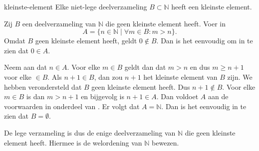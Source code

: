 \begin{stelling}{}{kleinste-element}
    Elke niet-lege deelverzameling $B \subset \mathbb{N}$ heeft een kleinste element.
\end{stelling}
\begin{bewijs}{}{}
    Zij $B$ een deelverzameling van $\mathbb{N}$ die geen kleinste element heeft.
    Voer in
    \[
        A = \{n \in \mathbb{N} \mid \forall m \in B: m > n\}.
    \]
    Omdat $B$ geen kleinste element heeft, geldt $0 \notin B$.
    Dan is het eenvoudig om in te zien dat $0 \in A$.

    Neem aan dat $n \in A$.
    Voor elke $m \in B$ geldt dan dat $m > n$ en dus $m \geq n+ 1$ voor elke $ \in B$.
    Als $n + 1 \in B$, dan zou $n + 1$ het kleinste element van $B$ zijn.
    We hebben verondersteld dat $B$ geen kleinste element heeft.
    Dus $n + 1 \notin B$.
    Voor elke $m \in B$ is dan $m > n+1 $ en bijgevolg is $n + 1 \in A$.
    Dan voldoet $A$ aan de voorwaarden in onderdeel  van .
    Er volgt dat $A = \mathbb{N}$.
    Dan is het eenvoudig in te zien dat $B = \emptyset$.

    De lege verzameling is dus de enige deelverzameling van $\mathbb{N}$ die geen kleinste element heeft.
    Hiermee is de welordening van $ \mathbb{N}$ bewezen.
\end{bewijs}

